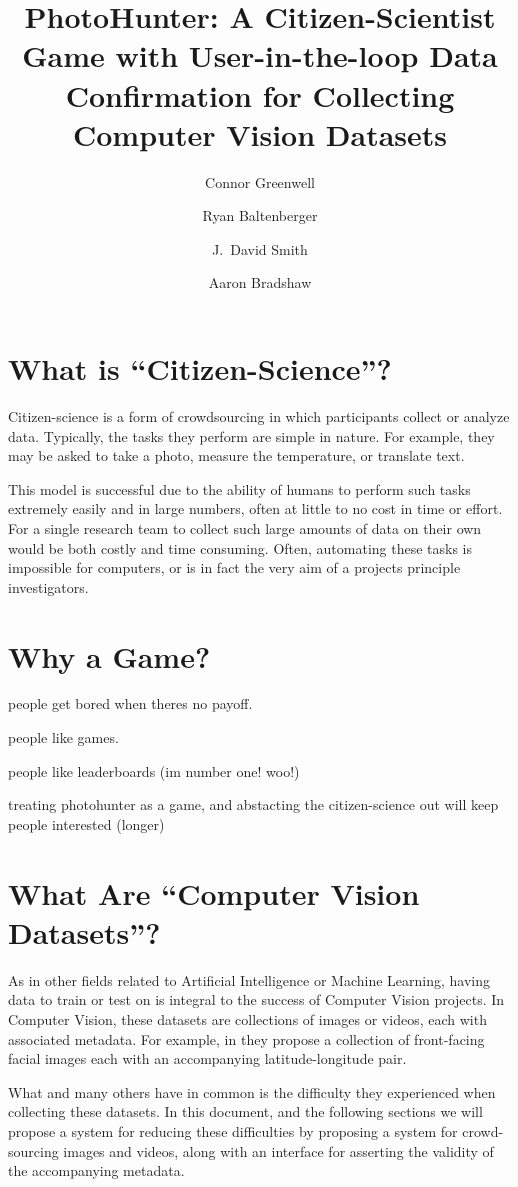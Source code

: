 \documentclass{article}
\title{PhotoHunter: A Citizen-Scientist Game with User-in-the-loop 
  Data Confirmation for Collecting Computer Vision Datasets}
\author{Connor Greenwell \and Ryan Baltenberger 
  \and J.\ David Smith \and Aaron Bradshaw}
\begin{document}
\maketitle

\section{What is ``Citizen-Science''?}

Citizen-science is a form of crowdsourcing in which participants
collect or analyze data. Typically, the tasks they perform are simple
in nature. For example, they may be asked to take a photo, measure the 
temperature, or translate text.

This model is successful due to the ability of humans to perform such
tasks extremely easily and in large numbers, often at little to no
cost in time or effort. For a single research team to collect such
large amounts of data on their own would be both costly and time
consuming. Often, automating these tasks is impossible for computers,
or is in fact the very aim of a projects principle investigators.

\section{Why a Game?}

people get bored when theres no payoff.

people like games. 

people like leaderboards (im number one! woo!)

treating photohunter as a game, and abstacting the citizen-science out
will keep people interested (longer)

\section{What Are ``Computer Vision Datasets''?}

As in other fields related to Artificial Intelligence or Machine
Learning, having data to train or test on is integral to the success
of Computer Vision projects. In Computer Vision, these datasets are 
collections of images or videos, each with
associated metadata. For example, in \cite{islam2014geofaces} they
propose a collection of front-facing facial images each with an
accompanying latitude-longitude pair. 

What \cite{islam2014geofaces} and many others have in common
is the difficulty they experienced when collecting these datasets. In
this document, and the following sections we will propose a system for
reducing these difficulties by proposing a system for crowd-sourcing
images and videos, along with an interface for asserting the validity
of the accompanying metadata.
\end{document}
